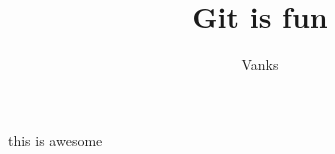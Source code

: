 \documentclass[10pt]{article}
\author{Vanks}
\title{Git is fun}
\begin{document}
	\maketitle

	this is awesome
\end{document}
